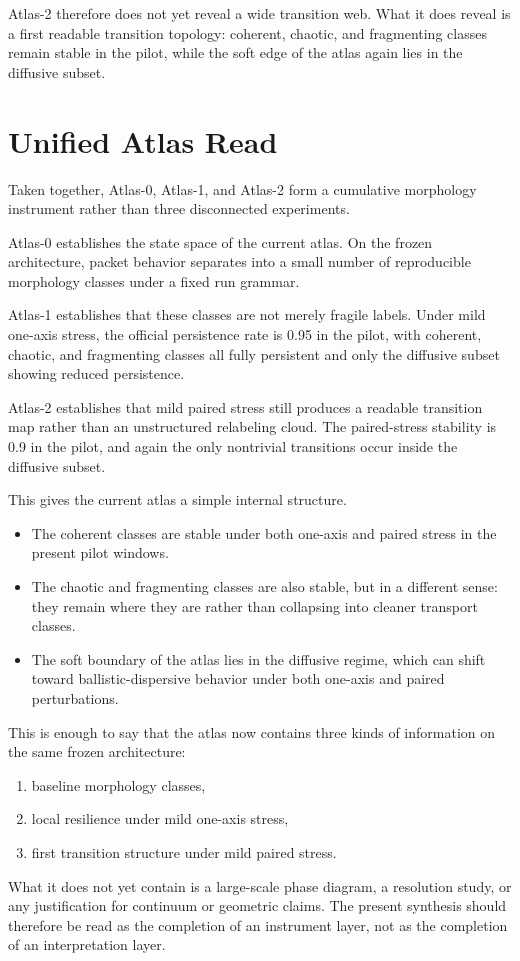 \documentclass[11pt]{article}
\begin{document}
Atlas-2 therefore does not yet reveal a wide transition web. What it does reveal is a first readable transition topology: coherent, chaotic, and fragmenting classes remain stable in the pilot, while the soft edge of the atlas again lies in the diffusive subset.

\section{Unified Atlas Read}
Taken together, Atlas-0, Atlas-1, and Atlas-2 form a cumulative morphology instrument rather than three disconnected experiments.

Atlas-0 establishes the state space of the current atlas. On the frozen architecture, packet behavior separates into a small number of reproducible morphology classes under a fixed run grammar.

Atlas-1 establishes that these classes are not merely fragile labels. Under mild one-axis stress, the official persistence rate is 0.95 in the pilot, with coherent, chaotic, and fragmenting classes all fully persistent and only the diffusive subset showing reduced persistence.

Atlas-2 establishes that mild paired stress still produces a readable transition map rather than an unstructured relabeling cloud. The paired-stress stability is 0.9 in the pilot, and again the only nontrivial transitions occur inside the diffusive subset.

This gives the current atlas a simple internal structure.
\begin{itemize}
\item The coherent classes are stable under both one-axis and paired stress in the present pilot windows.
\item The chaotic and fragmenting classes are also stable, but in a different sense: they remain where they are rather than collapsing into cleaner transport classes.
\item The soft boundary of the atlas lies in the diffusive regime, which can shift toward ballistic-dispersive behavior under both one-axis and paired perturbations.
\end{itemize}

This is enough to say that the atlas now contains three kinds of information on the same frozen architecture:
\begin{enumerate}
\item baseline morphology classes,
\item local resilience under mild one-axis stress,
\item first transition structure under mild paired stress.
\end{enumerate}
What it does not yet contain is a large-scale phase diagram, a resolution study, or any justification for continuum or geometric claims. The present synthesis should therefore be read as the completion of an instrument layer, not as the completion of an interpretation layer.
\end{document}

